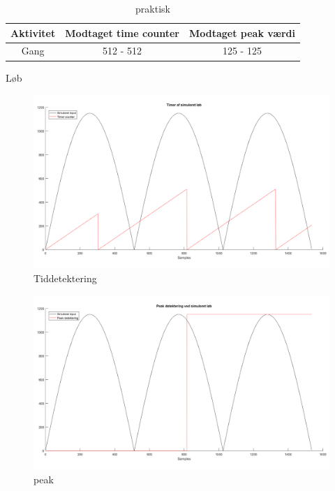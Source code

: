 \begin{table}[H]
	\centering
	\begin{tabular}{ccc}
		\hline
		\rowcolor[HTML]{C0C0C0} 
		Aktivitet & Modtaget time counter & Modtaget peak værdi \\ \hline
		Gang & 512 - 512 & 125 - 125 \\ \hline
	\end{tabular}
	\caption{praktisk}
	\label{my-label}
\end{table}

Løb
\begin{figure}[H]
	\centering
	\includegraphics[scale=0.6]{figures/cDesign/test_timecount_loeb.png}
	\caption{Tiddetektering }
	\label{fig:algoritme_cykling}
\end{figure}

\begin{figure}[H]
	\centering
	\includegraphics[scale=0.6]{figures/cDesign/test_peak_loeb.png}
	\caption{peak}
	\label{fig:algoritme_cykling}
\end{figure}


